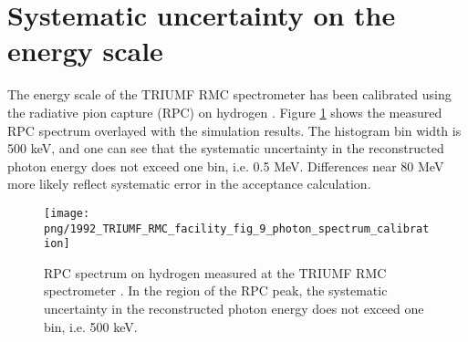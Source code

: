 \section { Systematic uncertainty on the energy scale}

The energy scale of the TRIUMF RMC spectrometer has been calibrated using the
radiative pion capture (RPC) on hydrogen \cite{RMC_1992_WRIGHT_1992_249}.
Figure \ref{fig:1992_photon_spectrum_calibration} shows the measured RPC spectrum
overlayed with the simulation results. The histogram bin width
is 500 keV, and one can see that the systematic uncertainty in the reconstructed
photon energy does not exceed one bin, i.e. 0.5 MeV. Differences near 80 MeV
more likely reflect systematic error in the acceptance calculation.

\begin{figure}[htbp]
  \begin{center}
    \texttt{[image: png/1992\_TRIUMF\_RMC\_facility\_fig\_9\_photon\_spectrum\_calibration]} 
  \end{center}
  \caption{
    RPC spectrum on hydrogen measured at the TRIUMF RMC spectrometer \cite{RMC_1992_WRIGHT_1992_249}.
    In the region of the RPC peak, the systematic uncertainty in the reconstructed photon energy does
    not exceed one bin, i.e. 500 keV.
  }
  \label{fig:1992_photon_spectrum_calibration}
\end{figure}

